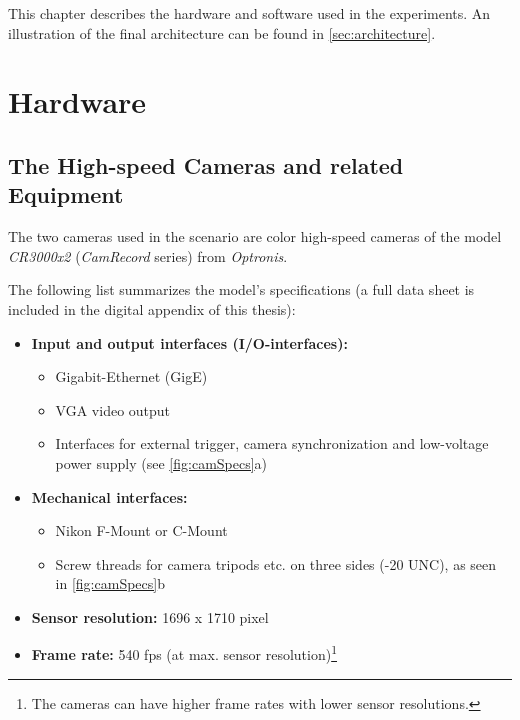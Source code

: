 This chapter describes the hardware and software used in the experiments. An illustration of the final architecture can be found in \autoref{sec:architecture}.
  
\section{Hardware} \label{sec:Hardware}
\subsection{The High-speed Cameras and related Equipment}
The two cameras used in the scenario are color high-speed cameras of the model \textit{CR3000x2} (\textit{CamRecord} series) from \textit{Optronis}. 

The following list summarizes the model's specifications (a full data sheet is included in the digital appendix of this thesis):
\begin{itemize}
\item \textbf{Input and output interfaces (I/O-interfaces):}
 \begin{itemize}
  \item Gigabit-Ethernet (GigE)
  \item VGA video output
  \item Interfaces for external trigger, camera synchronization and low-voltage power supply (see \autoref{fig:camSpecs}a)
 \end{itemize}
\item \textbf{Mechanical interfaces:}
 \begin{itemize}
  \item Nikon F-Mount or C-Mount
  \item Screw threads for camera tripods etc. on three sides (-20 UNC), as seen in \autoref{fig:camSpecs}b 
 \end{itemize}  
\item \textbf{Sensor resolution:} 1696 x 1710 pixel
\item \textbf{Frame rate:} 540 fps (at max. sensor resolution)\footnote{The cameras can have higher frame rates with lower sensor resolutions.}
\end{itemize}

